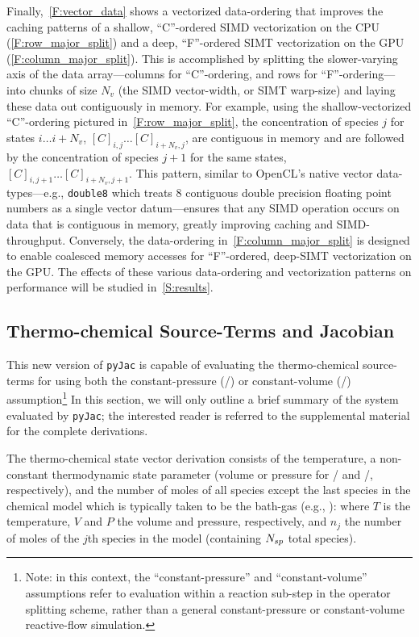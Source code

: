 \documentclass[12pt,number,sort&compress,preprint]{elsarticle}
\begin{document}
Finally,~\cref{F:vector_data} shows a vectorized data-ordering that improves the caching patterns of a shallow, ``C''-ordered SIMD vectorization on the CPU (\cref{F:row_major_split}) and a deep, ``F''-ordered SIMT vectorization on the GPU (\cref{F:column_major_split}).
This is accomplished by splitting the slower-varying axis of the data array---columns for ``C''-ordering, and rows for ``F''-ordering---into chunks of size $N_v$ (the SIMD vector-width, or SIMT warp-size) and laying these data out contiguously in memory.
For example, using the shallow-vectorized ``C''-ordering pictured in~\cref{F:row_major_split}, the concentration of species $j$ for states $i\ldots i+N_v$, $[C]_{i, j} \ldots [C]_{i + N_v, j}$, are contiguous in memory and are followed by the concentration of species $j + 1$ for the same states, $[C]_{i, j + 1} \ldots [C]_{i + N_v, j + 1}$.
This pattern, similar to OpenCL's native vector data-types---e.g., \texttt{double\num{8}} which treats \num{8} contiguous double precision floating point numbers as a single vector datum---ensures that any SIMD operation occurs on data that is contiguous in memory, greatly improving caching and SIMD-throughput.
Conversely, the data-ordering in~\cref{F:column_major_split} is designed to enable coalesced memory accesses for ``F''-ordered, deep-SIMT vectorization on the GPU.
The effects of these various data-ordering and vectorization patterns on performance will be studied in~\cref{S:results}.

\subsection{Thermo-chemical Source-Terms and Jacobian}
This new version of \texttt{pyJac} is capable of evaluating the thermo-chemical source-terms for using both the constant-pressure (\conp/) or constant-volume (\conv/) assumption\footnote{Note: in this context, the ``constant-pressure'' and ``constant-volume'' assumptions refer to evaluation within a reaction sub-step in the operator splitting scheme, rather than a general constant-pressure or constant-volume reactive-flow simulation.}
In this section, we will only outline a brief summary of the system evaluated by \texttt{pyJac}; the interested reader is referred to the supplemental material for the complete derivations.


The thermo-chemical state vector derivation consists of the temperature, a non-constant thermodynamic state parameter (volume or pressure for \conp/ and \conv/, respectively), and the number of moles of all species except the last species in the chemical model which is typically taken to be the bath-gas (e.g., ):
where $T$ is the temperature, $V$ and $P$ the volume and pressure, respectively, and $n_j$ the number of moles of the $j$th species in the model (containing $\ns/$ total species).
\end{document}
